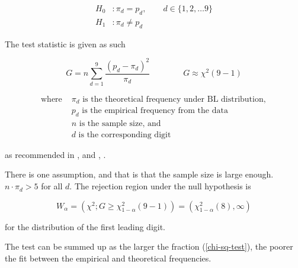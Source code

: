 \begin{align*}
    H_0&: \pi_d = p_d, \qquad d \in \{1,2,\dots 9\}\\
    H_1&: \pi_d \ne p_d
\end{align*}

The test statistic is given as such 

\begin{equation}
    \label{chi-sq-test}
    G= n \sum\limits_{d=1}^{9} \frac{(p_d -\pi_d)^2}{\pi_d} \qquad \qquad  G \approx \chi^2(9-1)
\end{equation}

\begin{align*}
    \text{where } &\pi_d \text{ is the theoretical frequency under BL distribution}, \\
    &p_d \text{ is the empirical frequency from the data} \\ 
    &n \text{ is the sample size, and} \\
    &d \text{ is the corresponding digit}
\end{align*} 

as recommended in \citeauthor{Hronova2023}, \citeyear{Hronova2023} and  \citeauthor{kossovsky2014benford}, \citeyear{kossovsky2014benford}. 

There is one assumption, and that is that the sample size is large enough.  
$n \cdot \pi_d > 5$ for all $d$. The rejection region under the null hypothesis is 

\begin{equation}
    W_\alpha = \left( \chi^2; G \ge \chi^2_{1-\alpha}(9-1) \right) = (\chi^2_{1-\alpha}(8), \infty)
\end{equation}

for the distribution of the first leading digit. 

The test can be summed up as the larger the fraction (\ref{chi-sq-test}), the poorer the fit between the empirical and theoretical frequencies.



